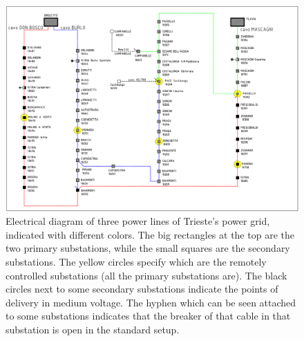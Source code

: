 \begin{figure}[ph]
    \centering
    \includegraphics[scale=0.35, center]{chapters/figures/Mastrino.png}
    \caption{Electrical diagram of three power lines of Trieste's power grid, indicated with different colors. The big rectangles at the top are the two primary substations, while the small squares are the secondary substations. The yellow circles specify which are the remotely controlled substations (all the primary substations are). The black circles next to some secondary substations indicate the points of delivery in medium voltage. The hyphen which can be seen attached to some substations indicates that the breaker of that cable in that substation is open in the standard setup.}
    \label{fig:mastrino}
\end{figure}

